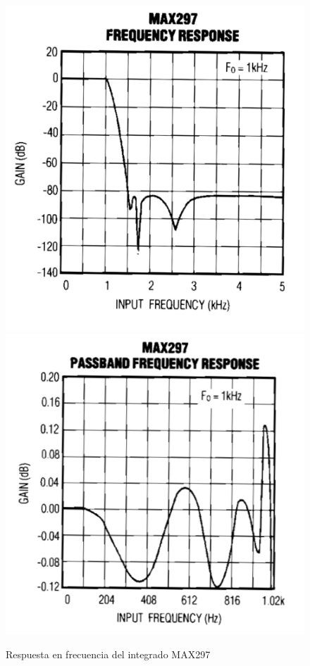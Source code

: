 \documentclass[assd_tp3_main.tex]{subfiles}
\begin{document}
\begin{figure}[!ht]
\begin{centering}
\includegraphics[scale=0.2]{images/ej1/tf.png}
\includegraphics[scale=0.4]{images/ej1/tfpaso.png}
\par\end{centering}
\caption{Respuesta en frecuencia del integrado MAX297}
\end{figure}
\end{document}
